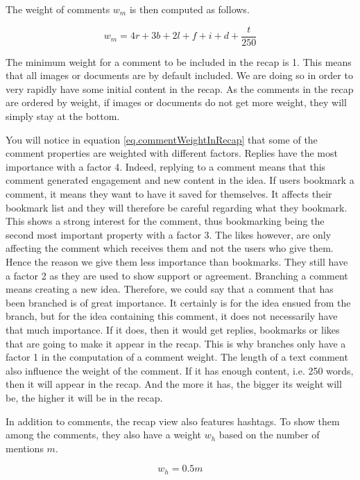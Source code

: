 \documentclass[a4paper,12pt,twoside]{article}
\begin{document}
The weight of comments $w_m$ is then computed as follows.

\begin{equation}
    \label{eq.commentWeightInRecap}
    w_m = 4r + 3b + 2l + f + i + d + \frac{t}{250}
\end{equation}

The minimum weight for a comment to be included in the recap is 1.
This means that all images or documents are by default included.
We are doing so in order to very rapidly have some initial content in the recap.
As the comments in the recap are ordered by weight, if images or documents do not get more weight, they will simply stay at the bottom.

You will notice in equation \ref{eq.commentWeightInRecap} that some of the comment properties are weighted with different factors.
Replies have the most importance with a factor 4.
Indeed, replying to a comment means that this comment generated engagement and new content in the idea.
If users bookmark a comment, it means they want to have it saved for themselves.
It affects their bookmark list and they will therefore be careful regarding what they bookmark.
This shows a strong interest for the comment, thus bookmarking being the second most important property with a factor 3.
The likes however, are only affecting the comment which receives them and not the users who give them.
Hence the reason we give them less importance than bookmarks.
They still have a factor 2 as they are used to show support or agreement.
Branching a comment means creating a new idea.
Therefore, we could say that a comment that has been branched is of great importance.
It certainly is for the idea ensued from the branch, but for the idea containing this comment, it does not necessarily have that much importance.
If it does, then it would get replies, bookmarks or likes that are going to make it appear in the recap.
This is why branches only have a factor 1 in the computation of a comment weight.
The length of a text comment also influence the weight of the comment.
If it has enough content, i.e. 250 words, then it will appear in the recap.
And the more it has, the bigger its weight will be, the higher it will be in the recap.

In addition to comments, the recap view also features hashtags.
To show them among the comments, they also have a weight $w_h$ based on the number of mentions $m$.

\begin{equation}
    \label{eq.hashtagWeightInRecap}
    w_h = 0.5m
\end{equation}
\end{document}
